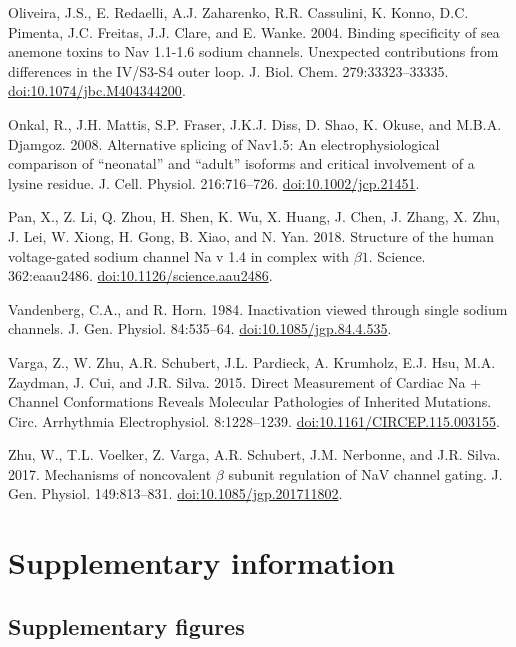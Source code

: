 \begin{hangparas}{.25in}{1}
Oliveira, J.S., E. Redaelli, A.J. Zaharenko, R.R. Cassulini, K. Konno, D.C. Pimenta, J.C. Freitas, J.J. Clare, and E. Wanke. 2004. Binding specificity of sea anemone toxins to Nav 1.1-1.6 sodium channels. Unexpected contributions from differences in the IV/S3-S4 outer loop. J. Biol. Chem. 279:33323–33335. \url{doi:10.1074/jbc.M404344200}.

Onkal, R., J.H. Mattis, S.P. Fraser, J.K.J. Diss, D. Shao, K. Okuse, and M.B.A. Djamgoz. 2008. Alternative splicing of Nav1.5: An electrophysiological comparison of “neonatal” and “adult” isoforms and critical involvement of a lysine residue. J. Cell. Physiol. 216:716–726. \url{doi:10.1002/jcp.21451}.

Pan, X., Z. Li, Q. Zhou, H. Shen, K. Wu, X. Huang, J. Chen, J. Zhang, X. Zhu, J. Lei, W. Xiong, H. Gong, B. Xiao, and N. Yan. 2018. Structure of the human voltage-gated sodium channel Na v 1.4 in complex with $\beta1$. Science. 362:eaau2486. \url{doi:10.1126/science.aau2486}.

Vandenberg, C.A., and R. Horn. 1984. Inactivation viewed through single sodium channels. J. Gen. Physiol. 84:535–64. \url{doi:10.1085/jgp.84.4.535}.

Varga, Z., W. Zhu, A.R. Schubert, J.L. Pardieck, A. Krumholz, E.J. Hsu, M.A. Zaydman, J. Cui, and J.R. Silva. 2015. Direct Measurement of Cardiac Na + Channel Conformations Reveals Molecular Pathologies of Inherited Mutations. Circ. Arrhythmia Electrophysiol. 8:1228–1239. \url{doi:10.1161/CIRCEP.115.003155}.

Zhu, W., T.L. Voelker, Z. Varga, A.R. Schubert, J.M. Nerbonne, and J.R. Silva. 2017. Mechanisms of noncovalent $\beta$ subunit regulation of NaV channel gating. J. Gen. Physiol. 149:813–831. \url{doi:10.1085/jgp.201711802}.
\end{hangparas}

\clearpage

\renewcommand{\thefigure}{A.S\arabic{figure}}
\renewcommand{\figurename}{Supplementary Fig.}
\setcounter{figure}{0}

\renewcommand{\thetable}{A.S\arabic{table}}
\renewcommand{\tablename}{Supplementary Table}
\setcounter{table}{0}

\section{Supplementary information}

\subsection{Supplementary figures}


